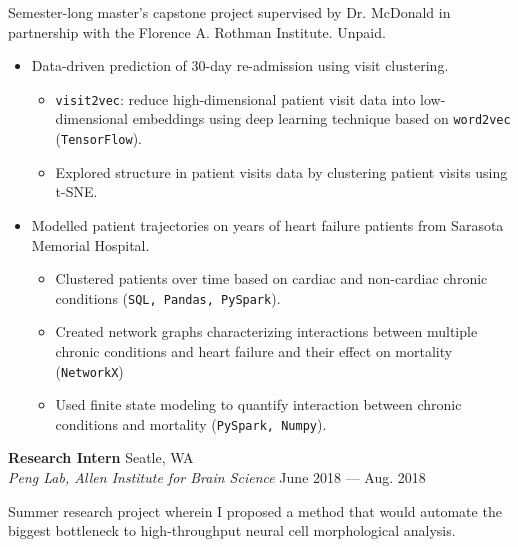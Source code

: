 \documentclass[a4paper,12pt]{article}
\newcommand{\ressubheading}[4]{{\begin{minipage}{\textwidth}
                                    \textbf{#1} \hfill #2 \\
                                    \textit{#3} \hfill #4 \\
\end{minipage}}}
\begin{document}
    \vspace{-6pt} Semester-long master's capstone project supervised by Dr. McDonald in partnership with the Florence A. Rothman Institute. Unpaid.


    \begin{itemize}
        \item Data-driven prediction of 30-day re-admission using visit clustering.

        \begin{itemize}
            \item \texttt{visit2vec}: reduce high-dimensional patient visit data into low-dimensional embeddings using deep learning technique based on \texttt{word2vec} (\texttt{TensorFlow}).
            \item Explored structure in patient visits data by clustering patient visits using t-SNE\@.
        \end{itemize}



        \item Modelled patient trajectories on years of heart failure patients from Sarasota Memorial Hospital.
        \begin{itemize}
            \item Clustered patients over time based on cardiac and non-cardiac chronic conditions (\texttt{SQL, Pandas, PySpark}).
            \item Created network graphs characterizing interactions between multiple chronic conditions and heart failure and their effect on mortality (\texttt{NetworkX})
            \item Used finite state modeling to quantify interaction between chronic conditions and mortality (\texttt{PySpark, Numpy}).
        \end{itemize}

    \end{itemize}

    \ressubheading{Research Intern}{Seatle, WA}{Peng Lab, Allen Institute for Brain Science}{June 2018 --- Aug. 2018}

    \vspace{-6pt} Summer research project wherein I proposed a method that would automate the biggest bottleneck to high-throughput neural cell morphological analysis.
\end{document}
